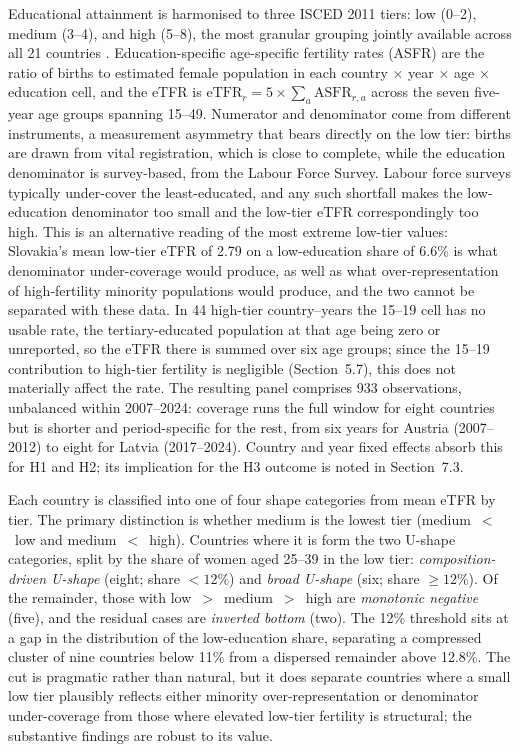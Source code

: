 \documentclass[12pt,a4paper]{report}
\begin{document}
Educational attainment is harmonised to three ISCED 2011 tiers: low (0--2), medium (3--4), and
high (5--8), the most granular grouping jointly available across all 21 countries \citep{skirbekk2008}.
Education-specific age-specific fertility rates (ASFR) are the ratio of births to estimated female
population in each country $\times$ year $\times$ age $\times$ education cell, and the eTFR is
$\mathrm{eTFR}_{r}=5\times\sum_{a}\mathrm{ASFR}_{r,a}$ across the seven five-year age groups spanning
15--49. Numerator and denominator come from different
instruments, a measurement asymmetry that bears directly on the low tier: births are
drawn from vital registration, which is close to complete, while the education denominator is
survey-based, from the Labour Force Survey. Labour force surveys typically under-cover the
least-educated, and any such shortfall makes the low-education denominator too small and the low-tier
eTFR correspondingly too high. This is an alternative reading of the most extreme low-tier values:
Slovakia's mean low-tier eTFR of 2.79 on a low-education share of 6.6\% is what
denominator under-coverage would produce, as well as what over-representation of high-fertility
minority populations would produce, and the two cannot be separated with these data. In 44 high-tier
country--years the 15--19 cell has no usable rate, the tertiary-educated population at that age being
zero or unreported, so the eTFR there is summed over six age groups; since the
15--19 contribution to high-tier fertility is negligible (Section~5.7), this does not
materially affect the rate. The resulting panel comprises 933 observations, unbalanced
within 2007--2024: coverage runs the full window for eight countries but is shorter and
period-specific for the rest, from six years for Austria (2007--2012) to eight for Latvia
(2017--2024). Country and year fixed effects absorb this for H1 and H2; its implication for the
H3 outcome is noted in Section~7.3.

Each country is classified into one of four shape categories from mean eTFR by tier. The primary
distinction is whether medium is the lowest tier (medium~$<$~low and medium~$<$~high). Countries where
it is form the two U-shape categories, split by the share of women aged 25--39 in the low tier:
\emph{composition-driven U-shape} (eight; share $<12\%$) and \emph{broad U-shape} (six; share
$\geq 12\%$). Of the remainder, those with low~$>$~medium~$>$~high are \emph{monotonic negative} (five),
and the residual cases are \emph{inverted bottom} (two). The 12\% threshold sits at a gap in the
distribution of the low-education share, separating a compressed cluster of nine countries below 11\%
from a dispersed remainder above 12.8\%. The cut is pragmatic rather than natural, but it does separate
countries where a small low tier plausibly reflects either minority over-representation or denominator
under-coverage from those where elevated low-tier fertility is structural; the substantive findings are
robust to its value.
\end{document}
